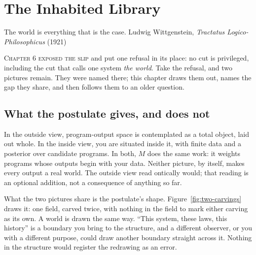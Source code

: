 \chapter{The Inhabited Library}

\chapterepigraph
{The world is everything that is the case.}
{Ludwig Wittgenstein, \textit{Tractatus Logico-Philosophicus} (1921)}

\noindent \textsc{Chapter 6 exposed the slip} and put one refusal in its place: no cut is privileged, including the cut that calls one system \emph{the world}. Take the refusal, and two pictures remain. They were named there; this chapter draws them out, names the gap they share, and then follows them to an older question.

\section*{What the postulate gives, and does not}

In the outside view, program-output space is contemplated as a total object, laid out whole. In the inside view, you are situated inside it, with finite data and a posterior over candidate programs. In both, $M$ does the same work: it weights programs whose outputs begin with your data. Neither picture, by itself, makes every output a real world. The outside view read ontically would; that reading is an optional addition, not a consequence of anything so far.

What the two pictures share is the postulate's shape. Figure~\ref{fig:two-carvings} draws it: one field, carved twice, with nothing in the field to mark either carving as its own. A world is drawn the same way. ``This system, these laws, this history'' is a boundary you bring to the structure, and a different observer, or you with a different purpose, could draw another boundary straight across it. Nothing in the structure would register the redrawing as an error.


